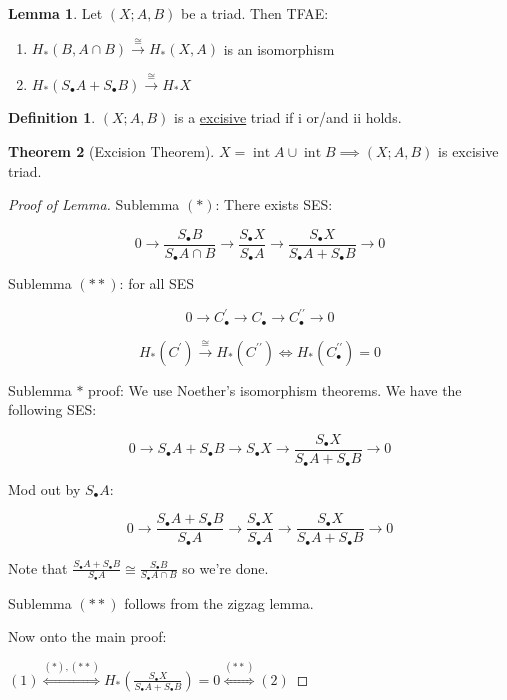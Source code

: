\documentclass{article}
\theoremstyle{definition}
\newtheorem*{definition}{Definition}
\newtheorem{theorem}{Theorem}
\newtheorem{lemma}[theorem]{Lemma}
\begin{document}
    \begin{lemma}
        Let \((X;A,B)\) be a triad. Then TFAE:

        \begin{enumerate}[label=\arabic*)]
            \item \(H_{\ast} (B,A\cap B) \xrightarrow{\cong} H_{\ast} (X,A)\) is an isomorphism 
            \item \(H_{\ast} (S_\bullet A + S_\bullet B) \xrightarrow{\cong} H_{\ast} X\)
        \end{enumerate} 
    \end{lemma}

    \begin{definition}
        \((X;A,B)\) is a \underline{excisive} triad if i or/and ii holds. 
    \end{definition}

    \begin{theorem}
        [Excision Theorem]

        \(X = \operatorname{int} A \cup \operatorname{int} B \implies (X;A,B)\) is excisive triad.
    \end{theorem}

    \begin{proof}
        [Proof of Lemma]

        Sublemma \((\ast)\): There exists SES:
        
        \[
            0 \to \frac{S_\bullet B}{S_\bullet A\cap B} \to \frac{S_\bullet X}{S_\bullet A}\to \frac{S_\bullet X}{S_\bullet A + S_\bullet B} \to 0
        \]

        Sublemma \((\ast \ast)\): for all SES

        \[
            0 \to C_\bullet^{\prime} \to C_\bullet \to C_\bullet^{\prime\prime} \to 0
        \]

        \[
            H_{\ast} (C^{\prime}) \xrightarrow{\cong} H_{\ast} (C^{\prime\prime}) \iff H_{\ast} (C_\bullet^{\prime\prime})=0
        \]

        Sublemma \(\ast\) proof: We use Noether's isomorphism theorems. We have the following SES:

        \[
            0 \to S_\bullet A + S_\bullet B \to S_\bullet X \to \frac{S_\bullet X}{S_\bullet A + S_\bullet B} \to 0
        \]

        Mod out by \(S_\bullet A\):

        \[
            0 \to \frac{S_\bullet A + S_\bullet B}{S_\bullet A} \to \frac{S_\bullet X}{S_\bullet A} \to \frac{S_\bullet X}{S_\bullet A + S_\bullet B} \to 0
        \]

        Note that \(\frac{S_\bullet A + S_\bullet B}{S_\bullet A} \cong \frac{S_\bullet B}{S_\bullet A\cap B}\) so we're done.

        Sublemma \((\ast \ast)\) follows from the zigzag lemma.

        Now onto the main proof:

        \((1) \overset{(\ast), (\ast \ast)}{\iff} H_{\ast}  \left( \frac{S_\bullet X}{S_\bullet A + S_\bullet B} \right) = 0 \overset{(\ast \ast)}{\iff} (2)\) 

    \end{proof}
\end{document}
